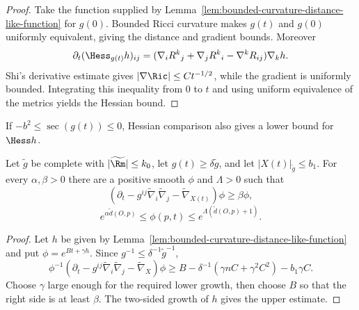 \begin{proof}
\sketch
{}
Take the function supplied by
Lemma~\ref{lem:bounded-curvature-distance-like-function} for $g(0)$.  Bounded
Ricci curvature makes $g(t)$ and $g(0)$ uniformly equivalent, giving the
distance and gradient bounds.  Moreover
\[
\partial_t(\Hess_{g(t)}h)_{ij}
=(\nabla_iR^k{}_j+\nabla_jR^k{}_i-\nabla^kR_{ij})\nabla_kh.
\]
Shi's derivative estimate gives $|\nabla\Ric|\leq C t^{-1/2}$, while the
gradient is uniformly bounded.  Integrating this inequality from $0$ to $t$
and using uniform equivalence of the metrics yields the Hessian bound.
\end{proof}

\begin{remark}
\label{rem:distance-like-hessian-lower-bound}
If $-b^2\leq\sec(g(t))\leq0$, Hessian comparison also gives a lower bound for
$\Hess h$.
\end{remark}

\begin{lemma}
\label{lem:general-metric-barrier-supersolution}
Let $\widetilde g$ be complete with $|\widetilde{\Rm}|\leq k_0$, let
$g(t)\geq\delta\widetilde g$, and let $|X(t)|_{\widetilde g}\leq b_1$.  For
every $\alpha,\beta>0$ there are a positive smooth $\phi$ and $\Lambda>0$ such
that
\[
(\partial_t-g^{ij}\widetilde\nabla_i\widetilde\nabla_j
-\widetilde\nabla_{X(t)})\phi\geq\beta\phi,
\]
\[
e^{\alpha\widetilde d(O,p)}\leq\phi(p,t)
 \leq e^{\Lambda(\widetilde d(O,p)+1)}.
\]
\end{lemma}

\begin{proof}
\sketch
{}
Let $h$ be given by Lemma~\ref{lem:bounded-curvature-distance-like-function}
and put $\phi=e^{Bt+\gamma h}$.  Since $g^{-1}\leq\delta^{-1}\widetilde
g^{-1}$,
\[
\phi^{-1}(\partial_t-g^{ij}\widetilde\nabla_i\widetilde\nabla_j
-\widetilde\nabla_X)\phi
\geq B-\delta^{-1}(\gamma nC+\gamma^2C^2)-b_1\gamma C.
\]
Choose $\gamma$ large enough for the required lower growth, then choose $B$
so that the right side is at least $\beta$.  The two-sided growth of $h$
gives the upper estimate.
\end{proof}

